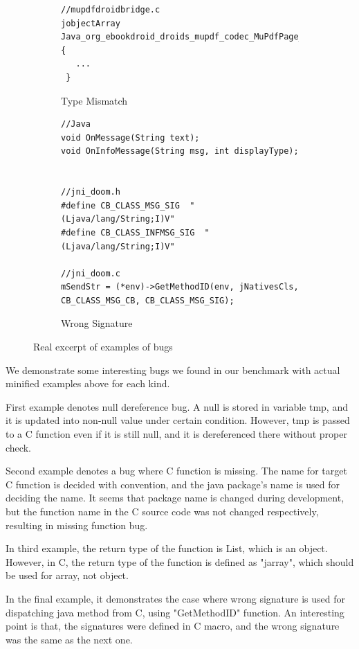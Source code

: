 \begin{figure}[t]
\begin{subfigure}[t]{0.5\textwidth}
\begin{lstlisting}[style=cpp,xleftmargin=2.5em]
//mupdfdroidbridge.c
jobjectArray Java_org_ebookdroid_droids_mupdf_codec_MuPdfPage_search(...){
   ...
 }
    \end{lstlisting}
    \vspace*{-.5em}
    \caption{Type Mismatch}
    \label{fig:bug3}
  \end{subfigure}
  \begin{subfigure}[t]{0.5\textwidth}
    \begin{lstlisting}[style=cpp,xleftmargin=2.5em]
//Java
void OnMessage(String text);
void OnInfoMessage(String msg, int displayType);


//jni_doom.h
#define CB_CLASS_MSG_SIG  "(Ljava/lang/String;I)V"
#define CB_CLASS_INFMSG_SIG  "(Ljava/lang/String;I)V"

//jni_doom.c
mSendStr = (*env)->GetMethodID(env, jNativesCls, CB_CLASS_MSG_CB, CB_CLASS_MSG_SIG);

    \end{lstlisting}
    \vspace*{-.5em}
    \caption{Wrong Signature}
    \label{fig:bug3}
  \end{subfigure}
  \vspace*{-.5em}
  \caption{Real excerpt of examples of bugs}
  \label{fig:bugs}
\end{figure}

We demonstrate some interesting bugs we found in our benchmark with actual minified examples above
for each kind.

First example denotes null dereference bug. A null is stored in variable tmp, and
it is updated into non-null value under certain condition. However, tmp is passed
to a C function even if it is still null, and it is dereferenced there
without proper check.

Second example denotes a bug where C function is missing. The name for target C
function is decided with convention, and the java package's name is used
for deciding the name. It seems that package name is changed during development,
but the function name in the C source code was not changed respectively, resulting
in missing function bug.

In third example, the return type of the function is List, which is an object.
However, in C, the return type of the function is defined as "jarray", which
should be used for array, not object.

In the final example, it demonstrates the case where wrong signature is used
for dispatching java method from C, using "GetMethodID" function. An interesting
point is that, the signatures were defined in C macro, and the wrong signature
was the same as the next one.

